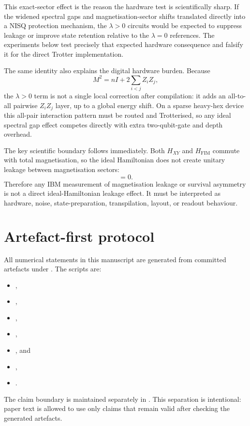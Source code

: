 \documentclass[preprint,aps,physrev,superscriptaddress,floatfix,longbibliography]{revtex4-2}
\begin{document}
This exact-sector effect is the reason the hardware test is scientifically
sharp. If the widened spectral gaps and magnetisation-sector shifts translated
directly into a NISQ protection mechanism, the $\lambda>0$ circuits would be
expected to suppress leakage or improve state retention relative to the
$\lambda=0$ references. The experiments below test precisely that expected
hardware consequence and falsify it for the direct Trotter implementation.

The same identity also explains the digital hardware burden. Because
%
\begin{equation}
  M^2 = nI + 2\sum_{i<j} Z_iZ_j,
  \label{eq:m2_pairwise}
\end{equation}
%
the $\lambda>0$ term is not a single local correction after compilation: it
adds an all-to-all pairwise $Z_iZ_j$ layer, up to a global energy shift. On a
sparse heavy-hex device this all-pair interaction pattern must be routed and
Trotterised, so any ideal spectral gap effect competes directly with extra
two-qubit-gate and depth overhead.

The key scientific boundary follows immediately. Both $H_{XY}$ and
$H_{\mathrm{FIM}}$ commute with total magnetisation, so the ideal Hamiltonian
does not create unitary leakage between magnetisation sectors:
%
\begin{equation}
  [H(\lambda),M]=0.
\end{equation}
%
Therefore any IBM measurement of magnetisation leakage or survival asymmetry is
not a direct ideal-Hamiltonian leakage effect. It must be interpreted as
hardware, noise, state-preparation, transpilation, layout, or readout behaviour.

\section{Artefact-first protocol}

All numerical statements in this manuscript are generated from committed artefacts
under . The scripts are:
%
\begin{itemize}
  \item {},
  \item {},
  \item {},
  \item {},
  \item {}, and
  \item {},
  \item {}.
\end{itemize}
%
The claim boundary is maintained separately in
. This separation is
intentional: paper text is allowed to use only claims that remain valid after
checking the generated artefacts.
\end{document}
